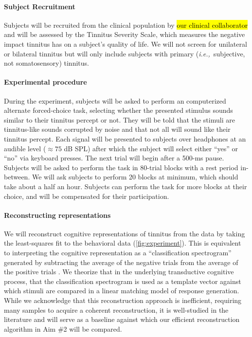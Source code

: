 \documentclass[11pt, notitlepage]{article} %
\def\ie{{\emph{i.e.,}}~}
\begin{document}
\paragraph{Subject Recruitment}

Subjects will be recruited from the clinical population by \hl{our clinical collaborator}
and will be assessed by the Tinnitus Severity Scale,
which measures the negative impact tinnitus has on a subject's quality of life.
We will not screen for unilateral or bilateral tinnitus but will only include subjects
with primary (\ie subjective, not somatosensory) tinnitus.

\paragraph{Experimental procedure}

During the experiment, subjects will be asked to perform an computerized alternate forced-choice task,
selecting whether the presented stimulus sounds similar to their tinnitus percept or not.
They will be told that the stimuli are tinnitus-like sounds corrupted by noise
and that not all will sound like their tinnitus percept.
Each signal will be presented to subjects over headphones
at an audible level ($\approx 75$ dB SPL) after which
the subject will select either ``yes'' or ``no'' via keyboard presses.
The next trial will begin after a 500-ms pause.
Subjects will be asked to perform the task in 80-trial blocks with a rest period in-between.
We will ask subjects to perform 20 blocks at minimum, which should take about a half an hour.
Subjects can perform the task for more blocks at their choice,
and will be compensated for their participation.

\paragraph{Reconstructing representations}

We will reconstruct cognitive representations of tinnitus from the data
by taking the least-squares fit to the behavioral data
(\autoref{fig:experiment}).
This is equivalent to interpreting the cognitive representation
as a ``classification spectrogram''
generated by subtracting the average of the negative trials from the average of the positive trials
\cite{gosselinSuperstitiousPerceptionsReveal2003}.
We theorize that in the underlying transductive cognitive process,
that the classification spectrogram is used as a template vector
against which stimuli are compared in a linear matching model of response generation.
While we acknowledge that this reconstruction approach is inefficient,
requiring many samples to acquire a coherent reconstruction,
it is well-studied in the literature
and will serve as a baseline against which our efficient reconstruction
algorithm in Aim \#2 will be compared.
\end{document}
